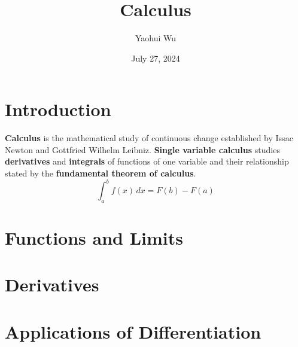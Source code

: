 \documentclass[12pt]{article}
\title{Calculus}
\author{Yaohui Wu}
\date{July 27, 2024}
\begin{document}
\maketitle

\section*{Introduction}
\textbf{Calculus} is the mathematical study of continuous change established
by Issac Newton and Gottfried Wilhelm Leibniz.
\textbf{Single variable calculus} studies \textbf{derivatives} and
\textbf{integrals} of functions of one variable and their relationship stated
by the \textbf{fundamental theorem of calculus}.
\[\int_a^b f(x)\,dx=F(b)-F(a)\]

\tableofcontents
\newpage

\section{Functions and Limits}






\section{Derivatives}












\section{Applications of Differentiation}



% 
% 
\end{document}
